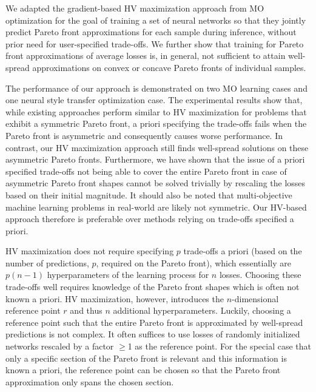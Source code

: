 We adapted the gradient-based HV maximization approach from MO optimization for the goal of training a set of neural networks so that they jointly predict Pareto front approximations for each sample during inference, without prior need for user-specified trade-offs. We further show that training for Pareto front approximations of average losses is, in general, not sufficient to attain well-spread approximations on convex or concave Pareto fronts of individual samples. 

The performance of our approach is demonstrated on two MO learning cases and one neural style transfer optimization case. The experimental results show that, while existing approaches perform similar to HV maximization for problems that exhibit a symmetric Pareto front, a priori specifying the trade-offs fails when the Pareto front is asymmetric and consequently causes worse performance. In contrast, our HV maximization approach still finds well-spread solutions on these asymmetric Pareto fronts. Furthermore, we have shown that the issue of a priori specified trade-offs not being able to cover the entire Pareto front in case of asymmetric Pareto front shapes cannot be solved trivially by rescaling the losses based on their initial magnitude.
It should also be noted that multi-objective machine learning problems in real-world are likely not symmetric. Our HV-based approach therefore is preferable over methods relying on trade-offs specified a priori.

HV maximization does not require specifying $p$  trade-offs a priori (based on the number of predictions, $p$, required on the Pareto front), which essentially are $p(n-1)$ hyperparameters of the learning process for $n$ losses. Choosing these trade-offs well requires knowledge of the Pareto front shapes which is often not known a priori. HV maximization, however, introduces the $n$-dimensional reference point $r$ and thus $n$ additional hyperparameters. Luckily, choosing a reference point such that the entire Pareto front is approximated by well-spread predictions is not complex. It often suffices to use losses of randomly initialized networks rescaled by a factor $\geq$1 as the reference point. For the special case that only a specific section of the Pareto front is relevant and this information is known a priori, the reference point can be chosen so that the Pareto front approximation only spans the chosen section.

